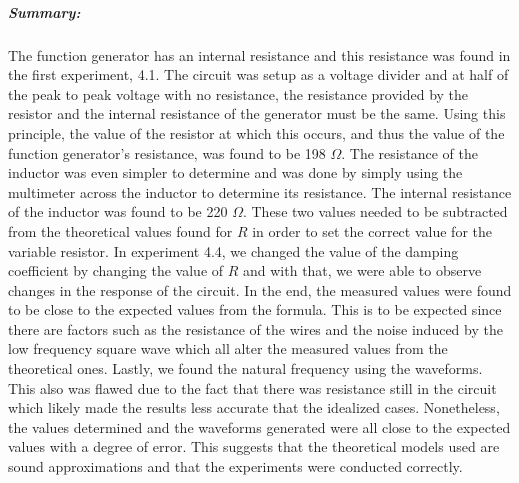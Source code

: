 \documentclass[12pt]{article}
\begin{document}
    \subparagraph*{Summary:}
    The function generator has an internal resistance and this resistance was found in the first experiment, 4.1. The circuit was setup as a voltage divider and at half of the peak to peak voltage with no resistance, the resistance provided by the resistor and the internal resistance of the generator must be the same. Using this principle, the value of the resistor at which this occurs, and thus the value of the function generator's resistance, was found to be 198 $ \Omega $. The resistance of the inductor was even simpler to determine and was done by simply using the multimeter across the inductor to determine its resistance. The internal resistance of the inductor was found to be 220 $ \Omega $. These two values needed to be subtracted from the theoretical values found for $ R $ in order to set the correct value for the variable resistor. In experiment 4.4, we changed the value of the damping coefficient by changing the value of $ R $ and with that, we were able to observe changes in the response of the circuit. In the end, the measured values were found to be close to the expected values from the formula. This is to be expected since there are factors such as the resistance of the wires and the noise induced by the low frequency square wave which all alter the measured values from the theoretical ones. Lastly, we found the natural frequency using the waveforms. This also was flawed due to the fact that there was resistance still in the circuit which likely made the results less accurate that the idealized cases. Nonetheless, the values determined and the waveforms generated were all close to the expected values with a degree of error. This suggests that the theoretical models used are sound approximations and that the experiments were conducted correctly.
\end{document}
